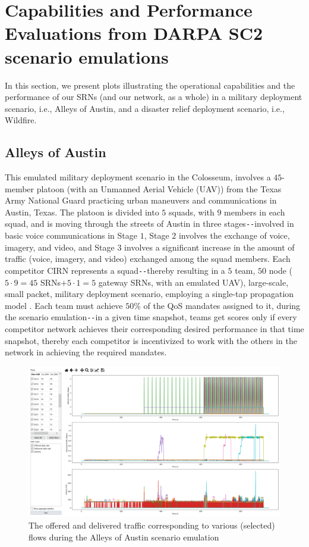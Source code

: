 \section{Capabilities and Performance Evaluations from DARPA SC2 scenario emulations}\label{B.IV}
In this section, we present plots illustrating the operational capabilities and the performance of our SRNs (and our network, as a whole) in a military deployment scenario, i.e., Alleys of Austin, and a disaster relief deployment scenario, i.e., Wildfire.
\subsection{Alleys of Austin}
This emulated military deployment scenario in the Colosseum, involves a $45$-member platoon (with an Unmanned Aerial Vehicle (UAV)) from the Texas Army National Guard practicing urban maneuvers and communications in Austin, Texas. The platoon is divided into $5$ squads, with $9$ members in each squad, and is moving through the streets of Austin in three stages\texttt{-{}-}involved in basic voice communications in Stage $1$, Stage $2$ involves the exchange of voice, imagery, and video, and Stage $3$ involves a significant increase in the amount of traffic (voice, imagery, and video) exchanged among the squad members. Each competitor CIRN represents a squad\texttt{-{}-}thereby resulting in a $5$ team, $50$ node ($5{\cdot}9{=}45$ SRNs${+}5{\cdot}1{=}5$ gateway SRNs, with an emulated UAV), large-scale, small packet, military deployment scenario, employing a single-tap propagation model \cite{DARPA:SC2scenarios}. Each team must achieve $50$\% of the QoS mandates assigned to it, during the scenario emulation\texttt{-{}-}in a given time snapshot, teams get scores only if every competitor network achieves their corresponding desired performance in that time snapshot, thereby each competitor is incentivized to work with the others in the network in achieving the required mandates.
\begin{figure} [htb]
    \centerline{
    \includegraphics[width = 1.0\textwidth]{Alleys_NET.PNG}}
    \caption{The offered and delivered traffic corresponding to various (selected) flows during the Alleys of Austin scenario emulation}
    \label{fig:B.6}
\end{figure}

